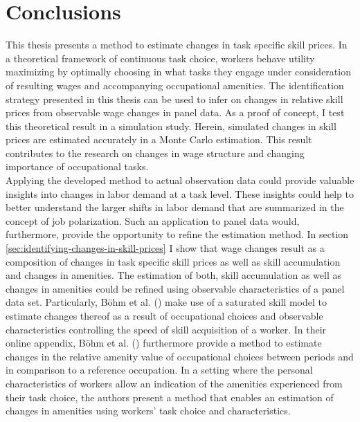 \documentclass[../main.tex]{subfiles}
\begin{document}
\section{Conclusions}
\label{sec:conclusions}
This thesis presents a method to estimate changes in task specific skill prices. In a theoretical framework of continuous task choice, workers behave utility maximizing by optimally choosing in what tasks they engage under consideration of resulting wages and accompanying occupational amenities. The identification strategy presented in this thesis can be used to infer on changes in relative skill prices from observable wage changes in panel data. As a proof of concept, I test this theoretical result in a simulation study. Herein, simulated changes in skill prices are estimated accurately in a Monte Carlo estimation. This result contributes to the research on changes in wage structure and changing importance of occupational tasks.
\\
Applying the developed method to actual observation data could provide valuable insights into changes in labor demand at a task level. These insights could help to better understand the larger shifts in  labor demand that are summarized in the concept of job polarization. Such an application to panel data would, furthermore, provide the opportunity to refine the estimation method. In section \ref{sec:identifying-changes-in-skill-prices} I show that wage changes result as a composition of changes in task specific skill prices as well as skill accumulation and changes in amenities. The estimation of both, skill accumulation as well as changes in amenities could be refined using observable characteristics of a panel data set. Particularly, Böhm et al. (\citeyear{bohm2019occupation}) make use of a saturated skill model to estimate changes thereof as a result of occupational choices and observable characteristics controlling the speed of skill acquisition of a worker. In their online appendix, Böhm et al. (\citeyear{bohm2019occupation}) furthermore provide a method to estimate changes in the relative amenity value of occupational choices between periods and in comparison to a reference occupation. In a setting where the personal characteristics of workers allow an indication of the amenities experienced from their task choice, the authors present a method that enables an estimation of changes in amenities using workers' task choice and characteristics.
\end{document}
